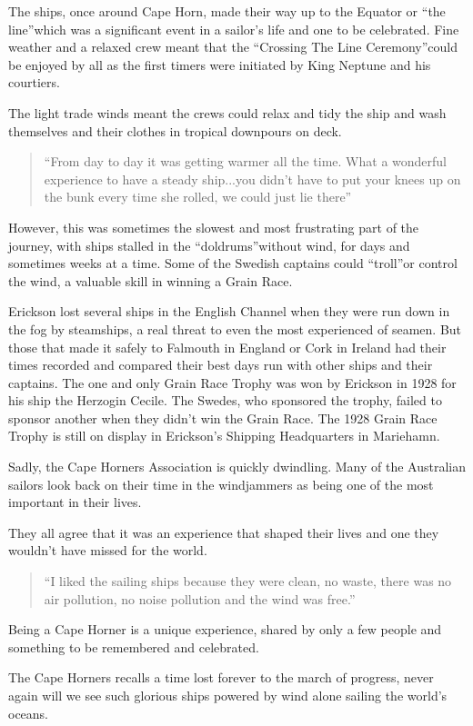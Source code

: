 \documentclass[
  11pt,
  msmallroyalvopaper
]{memoir}
\begin{document}
The ships, once around Cape Horn, made their way up to the Equator or
“the line”which was a significant event in a sailor’s life and one to be
celebrated. Fine weather and a relaxed crew meant that the “Crossing The
Line Ceremony”could be enjoyed by all as the first timers were initiated
by King Neptune and his courtiers.

The light trade winds meant the crews could relax and tidy the ship and
wash themselves and their clothes in tropical downpours on deck.

\begin{quote}
“From day to day it was getting warmer all the time. What a wonderful
experience to have a steady ship...you didn’t have to put your knees up
on the bunk every time she rolled, we could just lie there”
\end{quote}

However, this was sometimes the slowest and most frustrating part of the
journey, with ships stalled in the “doldrums”without wind, for days and
sometimes weeks at a time. Some of the Swedish captains could “troll”or
control the wind, a valuable skill in winning a Grain Race.

Erickson lost several ships in the English Channel when they were run
down in the fog by steamships, a real threat to even the most
experienced of seamen. But those that made it safely to Falmouth in
England or Cork in Ireland had their times recorded and compared their
best days run with other ships and their captains. The one and only
Grain Race Trophy was won by Erickson in 1928 for his ship the Herzogin
Cecile. The Swedes, who sponsored the trophy, failed to sponsor another
when they didn’t win the Grain Race. The 1928 Grain Race Trophy is still
on display in Erickson’s Shipping Headquarters in Mariehamn.

Sadly, the Cape Horners Association is quickly dwindling. Many of the
Australian sailors look back on their time in the windjammers as being
one of the most important in their lives.

They all agree that it was an experience that shaped their lives and one
they wouldn’t have missed for the world.

\begin{quote}
“I liked the sailing ships because they were clean, no waste, there was
no air pollution, no noise pollution and the wind was free.”
\end{quote}

Being a Cape Horner is a unique experience, shared by only a few people
and something to be remembered and celebrated.

The Cape Horners recalls a time lost forever to the march of progress,
never again will we see such glorious ships powered by wind alone
sailing the world’s oceans.


\backmatter
\end{document}
